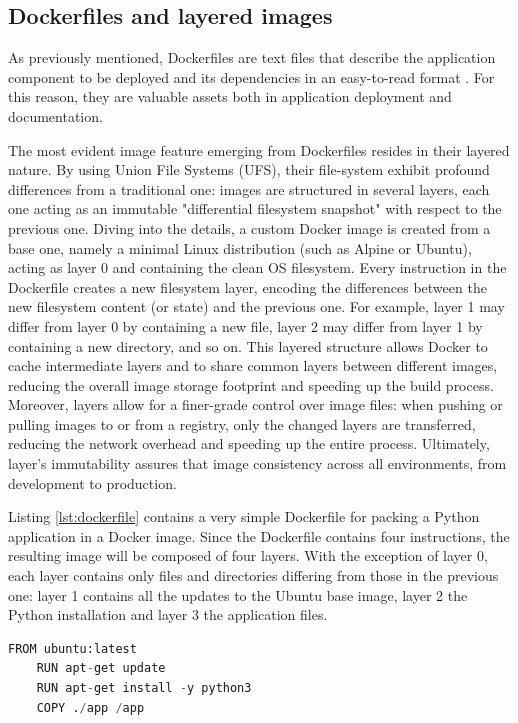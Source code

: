 \subsection{Dockerfiles and layered images}
As previously mentioned, Dockerfiles are text files that describe the application component to be deployed and its dependencies in an easy-to-read format \cite{poultonDockerDeepDive2023}. For this reason, they are valuable assets both in application deployment and documentation.

The most evident image feature emerging from  Dockerfiles resides in their layered nature. 
By using Union File Systems (UFS), their file-system exhibit profound differences from a traditional one: images are structured in several layers, each one acting as an immutable "differential filesystem snapshot" with respect to the previous one. Diving into the details, a custom Docker image is created from a base one, namely a minimal Linux distribution (such as Alpine or Ubuntu), acting as layer 0 and containing the clean OS filesystem. Every instruction in the Dockerfile creates a new filesystem layer, encoding the differences between the new filesystem content (or state) and the previous one. For example, layer 1 may differ from layer 0 by containing a new file, layer 2 may differ from layer 1 by containing a new directory, and so on.
This layered structure allows Docker to cache intermediate layers and to share common layers between different images, reducing the overall image storage footprint and speeding up the build process. 
Moreover, layers allow for a finer-grade control over image files: when pushing or pulling images to or from a registry, only the changed layers are transferred, reducing the network overhead and speeding up the entire process. Ultimately, layer's immutability assures that image consistency across all environments, from development to production.

Listing \ref{lst:dockerfile} contains a very simple Dockerfile for packing a Python application in a Docker image. 
Since the Dockerfile contains four instructions, the resulting image will be composed of four layers. With the exception of layer 0, each layer contains only files and directories differing from those in the previous one: layer 1 contains all the updates to the Ubuntu base image, layer 2 the Python installation and layer 3 the application files.

\vspace{10pt}
\begin{lstlisting}[language=Python, caption = Example of a simple Dockerfile, label = lst:dockerfile]
    FROM ubuntu:latest
    RUN apt-get update
    RUN apt-get install -y python3
    COPY ./app /app
\end{lstlisting}
\vspace{10pt}

